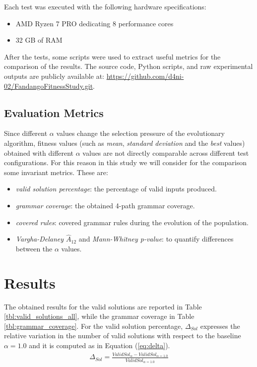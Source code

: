 \documentclass[conference]{IEEEtran}
\begin{document}
Each test was executed with the following hardware specifications:
\begin{itemize}
\item AMD Ryzen 7 PRO dedicating 8 performance cores
  \item 32 GB of RAM
\end{itemize}
After the tests, some scripts were used to extract useful metrics for the comparison of the results.
  The source code, Python scripts, and raw experimental outputs are publicly available at:
\url{https://github.com/d4ni-02/FandangoFitnessStudy.git}.



\subsection{Evaluation Metrics}
Since different $\alpha$ values change the selection pressure of the evolutionary algorithm, fitness values (such as \textit{mean}, \textit{standard deviation} and the \textit{best} values) obtained with different $\alpha$ values are not directly comparable across different test configurations. For this reason in this study we will consider for the comparison some invariant metrics.
These are:
\begin{itemize}
\item \textit{valid solution percentage}: the percentage of valid inputs produced.
\item \textit{grammar coverage}: the obtained 4-path grammar coverage.
\item \textit{covered rules}: covered grammar rules during the evolution of the population.
\item \textit{Vargha-Delaney $\hat{A}_{12}$} and \textit{Mann-Whitney p-value}: to quantify differences between the $\alpha$ values.
\end{itemize}


\section{Results}
The obtained results for the valid solutions are reported in Table \ref{tbl:valid_solutions_all}, while the grammar coverage in Table \ref{tbl:grammar_coverage}. For the valid solution percentage, $\Delta_{Sol}$ expresses the relative variation in the number of valid solutions with respect to the baseline $\alpha=1.0$ and it is computed as in Equation (\ref{eq:delta}).
\begin{align}\label{eq:delta}
  \Delta_{Sol} = \frac{ValidSol_{\alpha} - ValidSol_{\alpha=1.0}}{ValidSol_{\alpha=1.0}}
\end{align}
\end{document}

